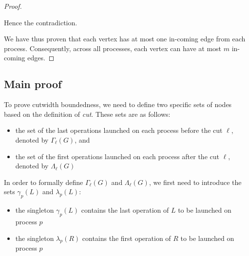 \documentclass[12pt]{article}
\begin{document}
\begin{proof}
\begin{itemize}[label=$\ast$,itemsep=0pt,parsep=0pt]
Hence the contradiction.
\end{itemize}

We have thus proven that each vertex has at most one in-coming edge from each process. Consequently, across all processes, each vertex can have at most $m$ in-coming edges.
\end{proof}

\subsection{Main proof}


To prove cutwidth boundedness, we need to define two specific sets of nodes  based on the definition of \textsl{cut}. These sets are as follows:
\begin{itemize}[label=$\ast$,itemsep=0pt,parsep=0pt]
	\item the set of the last operations launched on each process before the cut $\ell$, denoted by $\Gamma_\ell(G)$, and
	\item the set of the first operations launched on each process after the cut $\ell$, denoted by $\Lambda_\ell(G)$
\end{itemize}

In order to formally define $\Gamma_\ell(G)$ and $\Lambda_\ell(G)$, we first need to introduce the sets $\gamma_p(L)$ and $\lambda_p(L)$:

\begin{itemize}[label=$\ast$,itemsep=0pt,parsep=0pt]
	\item the singleton $\gamma_p(L)$ contains the last operation of $L$ to be launched on process $p$
	\item the singleton $\lambda_p(R)$ contains the first operation of $R$ to be launched on process $p$
\end{itemize}
\end{document}
